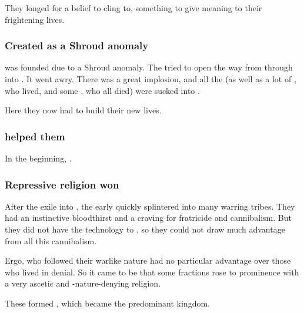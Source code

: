 
They longed for a belief to cling to, something to give meaning to their frightening lives. 





\subsubsection{Created as a Shroud anomaly}
\Merkyrah{} was founded due to a Shroud anomaly. 
The \banes{} tried to open the way from \Erebos{} through \Nyx{} into \Tembrae. 
It went awry. 
There was a great implosion, and all the \resphain{} (as well as a lot of \nephilim, who lived, and some \humans{}, who all died) were sucked into \Nyx. 

Here they now had to build their new lives. 





\subsubsection{\Semiza helped them}
In the beginning, . 





\subsubsection{Repressive religion won}
After the exile into \Nyx, the early \resphain{} quickly splintered into many warring tribes. 
They had an instinctive bloodthirst and a craving for fratricide and cannibalism. 
But they did not have the technology to , so they could not draw much advantage from all this cannibalism. 

Ergo, \resphain{} who followed their warlike nature had no particular advantage over those who lived in denial. 
So it came to be that some fractions rose to prominence with a very ascetic and \resphan-nature-denying religion. 

These formed \Merkyrah, which became the predominant \resphan{} kingdom. 





